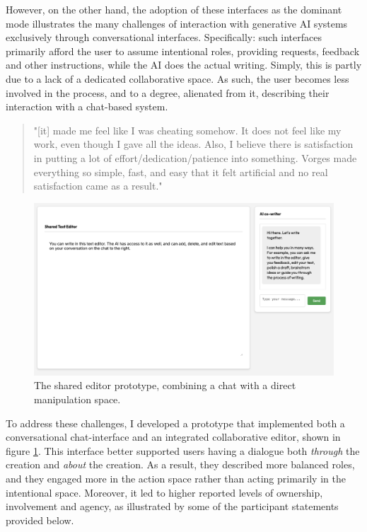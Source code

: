 However, on the other hand, the adoption of these interfaces as the dominant mode illustrates the many challenges of interaction with generative AI systems exclusively through conversational interfaces. Specifically: such interfaces primarily afford the user to assume intentional roles, providing requests, feedback and other instructions, while the AI does the actual writing. Simply, this is partly due to a lack of a dedicated collaborative space. As such, the user becomes less involved in the process, and to a degree, alienated from it, describing their interaction with a chat-based system.

\begin{quote}
"[it] made me feel like I was cheating somehow. It does not feel like my work, even though I gave all the ideas. Also, I believe there is satisfaction in putting a lot of effort/dedication/patience into something. Vorges made everything so simple, fast, and easy that it felt artificial and no real satisfaction came as a result."
\end{quote}

\begin{figure}[H]
    \centering
    \includegraphics[width=1\linewidth]{sharededitor.png}
    \caption{The shared editor prototype, combining a chat with a direct manipulation space.}
    \label{fig:shared-editor}
\end{figure}

To address these challenges, I developed a prototype that implemented both a conversational chat-interface and an integrated collaborative editor, shown in figure \ref{fig:shared-editor}. This interface better supported users having a dialogue both \textit{through} the creation and \textit{about} the creation. As a result, they described more balanced roles, and they engaged more in the action space rather than acting primarily in the intentional space. Moreover, it led to higher reported levels of ownership, involvement and agency, as illustrated by some of the participant statements provided below.

